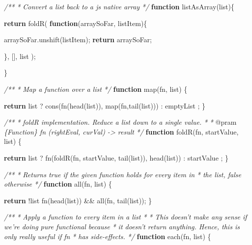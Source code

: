 \documentclass[]{article}
\newenvironment{Shaded}{}{}
\newcommand{\KeywordTok}[1]{\textcolor[rgb]{0.00,0.44,0.13}{\textbf{{#1}}}}
\newcommand{\CommentTok}[1]{\textcolor[rgb]{0.38,0.63,0.69}{\textit{{#1}}}}
\newcommand{\OtherTok}[1]{\textcolor[rgb]{0.00,0.44,0.13}{{#1}}}
\newcommand{\FunctionTok}[1]{\textcolor[rgb]{0.02,0.16,0.49}{{#1}}}
\newcommand{\NormalTok}[1]{{#1}}
\begin{document}
\begin{Shaded}
\begin{Highlighting}[]
\CommentTok{/**}
\CommentTok{ * Convert a list back to a js native array}
\CommentTok{ */}
\KeywordTok{function} \FunctionTok{listAsArray}\NormalTok{(list)\{}

   \KeywordTok{return} \FunctionTok{foldR}\NormalTok{( }\KeywordTok{function}\NormalTok{(arraySoFar, listItem)\{}
      
      \OtherTok{arraySoFar}\NormalTok{.}\FunctionTok{unshift}\NormalTok{(listItem);}
      \KeywordTok{return} \NormalTok{arraySoFar;}
           
   \NormalTok{\}, [], list );}
   
\NormalTok{\}}

\CommentTok{/**}
\CommentTok{ * Map a function over a list }
\CommentTok{ */}
\KeywordTok{function} \FunctionTok{map}\NormalTok{(fn, list) \{}

   \KeywordTok{return} \NormalTok{list}
            \NormalTok{? }\FunctionTok{cons}\NormalTok{(}\FunctionTok{fn}\NormalTok{(}\FunctionTok{head}\NormalTok{(list)), }\FunctionTok{map}\NormalTok{(fn,}\FunctionTok{tail}\NormalTok{(list)))}
            \NormalTok{: emptyList}
            \NormalTok{;}
\NormalTok{\}}

\CommentTok{/**}
\CommentTok{ * foldR implementation. Reduce a list down to a single value.}
\CommentTok{ * }
\CommentTok{ * }\NormalTok{@pram}\CommentTok{ \{Function\} fn     (rightEval, curVal) -> result }
\CommentTok{ */}
\KeywordTok{function} \FunctionTok{foldR}\NormalTok{(fn, startValue, list) \{}
      
   \KeywordTok{return} \NormalTok{list }
            \NormalTok{? }\FunctionTok{fn}\NormalTok{(}\FunctionTok{foldR}\NormalTok{(fn, startValue, }\FunctionTok{tail}\NormalTok{(list)), }\FunctionTok{head}\NormalTok{(list))}
            \NormalTok{: startValue}
            \NormalTok{;}
\NormalTok{\}}

\CommentTok{/** }
\CommentTok{ * Returns true if the given function holds for every item in }
\CommentTok{ * the list, false otherwise }
\CommentTok{ */}
\KeywordTok{function} \FunctionTok{all}\NormalTok{(fn, list) \{}
   
   \KeywordTok{return} \NormalTok{!list \textbar{}\textbar{} }
          \FunctionTok{fn}\NormalTok{(}\FunctionTok{head}\NormalTok{(list)) && }\FunctionTok{all}\NormalTok{(fn, }\FunctionTok{tail}\NormalTok{(list));}
\NormalTok{\}}

\CommentTok{/**}
\CommentTok{ * Apply a function to every item in a list}
\CommentTok{ * }
\CommentTok{ * This doesn't make any sense if we're doing pure functional because }
\CommentTok{ * it doesn't return anything. Hence, this is only really useful if fn }
\CommentTok{ * has side-effects. }
\CommentTok{ */}
\KeywordTok{function} \FunctionTok{each}\NormalTok{(fn, list) \{}


\end{Highlighting}
\end{Shaded}
\end{document}
